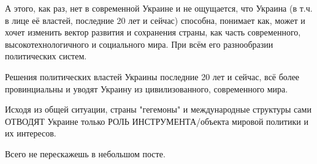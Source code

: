 А этого, как раз, нет в современной Украине и не ощущается, что Украина (в т.ч.
в лице её властей, последние 20 лет и сейчас) способна, понимает как, может и
хочет изменить вектор развития и сохранения страны, как часть современного,
высокотехнологичного и социального мира. При всём его разнообразии политических
систем.

Решения политических властей Украины последние 20 лет и сейчас, всё более
провинциальны и уводят Украину из цивилизованного, современного мира.

Исходя из общей ситуации, страны "гегемоны" и международные структуры сами
ОТВОДЯТ Украине только РОЛЬ ИНСТРУМЕНТА/объекта мировой политики и их
интересов. 

Всего не перескажешь в небольшом посте.
